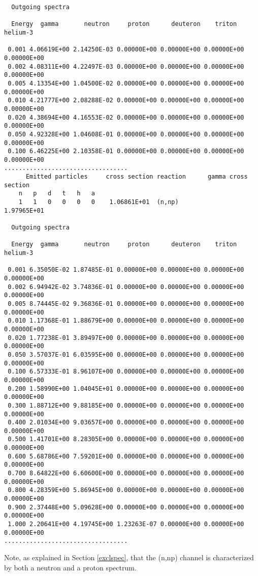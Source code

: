 \begin{samplecase}
{\begin{verbatim}
  Outgoing spectra

  Energy  gamma       neutron     proton      deuteron    triton      helium-3  

 0.001 4.06619E+00 2.14250E-03 0.00000E+00 0.00000E+00 0.00000E+00 0.00000E+00
 0.002 4.08311E+00 4.22497E-03 0.00000E+00 0.00000E+00 0.00000E+00 0.00000E+00
 0.005 4.13354E+00 1.04500E-02 0.00000E+00 0.00000E+00 0.00000E+00 0.00000E+00
 0.010 4.21777E+00 2.08288E-02 0.00000E+00 0.00000E+00 0.00000E+00 0.00000E+00
 0.020 4.38694E+00 4.16553E-02 0.00000E+00 0.00000E+00 0.00000E+00 0.00000E+00
 0.050 4.92328E+00 1.04608E-01 0.00000E+00 0.00000E+00 0.00000E+00 0.00000E+00
 0.100 6.46225E+00 2.10358E-01 0.00000E+00 0.00000E+00 0.00000E+00 0.00000E+00
..................................
      Emitted particles     cross section reaction      gamma cross section
    n   p   d   t   h   a
    1   1   0   0   0   0    1.06861E+01  (n,np)            1.97965E+01
 
  Outgoing spectra
 
  Energy  gamma       neutron     proton      deuteron    triton      helium-3  
   
 0.001 6.35050E-02 1.87485E-01 0.00000E+00 0.00000E+00 0.00000E+00 0.00000E+00
 0.002 6.94942E-02 3.74836E-01 0.00000E+00 0.00000E+00 0.00000E+00 0.00000E+00
 0.005 8.74445E-02 9.36836E-01 0.00000E+00 0.00000E+00 0.00000E+00 0.00000E+00
 0.010 1.17368E-01 1.88679E+00 0.00000E+00 0.00000E+00 0.00000E+00 0.00000E+00
 0.020 1.77238E-01 3.89497E+00 0.00000E+00 0.00000E+00 0.00000E+00 0.00000E+00
 0.050 3.57037E-01 6.03595E+00 0.00000E+00 0.00000E+00 0.00000E+00 0.00000E+00
 0.100 6.57333E-01 8.96107E+00 0.00000E+00 0.00000E+00 0.00000E+00 0.00000E+00
 0.200 1.58990E+00 1.04045E+01 0.00000E+00 0.00000E+00 0.00000E+00 0.00000E+00
 0.300 1.88712E+00 9.88185E+00 0.00000E+00 0.00000E+00 0.00000E+00 0.00000E+00
 0.400 2.01034E+00 9.03657E+00 0.00000E+00 0.00000E+00 0.00000E+00 0.00000E+00
 0.500 1.41701E+00 8.28305E+00 0.00000E+00 0.00000E+00 0.00000E+00 0.00000E+00
 0.600 5.68786E+00 7.59201E+00 0.00000E+00 0.00000E+00 0.00000E+00 0.00000E+00
 0.700 8.64822E+00 6.60600E+00 0.00000E+00 0.00000E+00 0.00000E+00 0.00000E+00
 0.800 4.28359E+00 5.86945E+00 0.00000E+00 0.00000E+00 0.00000E+00 0.00000E+00
 0.900 2.37448E+00 5.09628E+00 0.00000E+00 0.00000E+00 0.00000E+00 0.00000E+00
 1.000 2.20641E+00 4.19745E+00 1.23263E-07 0.00000E+00 0.00000E+00 0.00000E+00
..................................
\end{verbatim} } \renewcommand{\baselinestretch}{1.07}\small\normalsize
\noindent
Note, as explained in Section \ref{exclspec}, that the (n,np) channel is 
characterized by both a neutron and a proton spectrum.

\end{samplecase}
